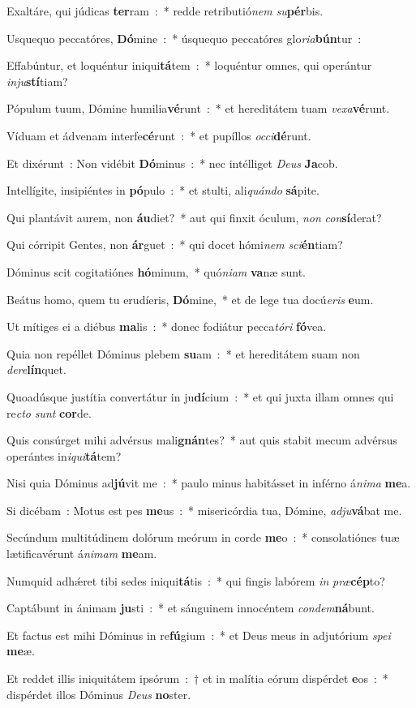 ﻿\item Exaltáre, qui júdicas \textbf{ter}ram~:~* redde retributió\emph{nem} \emph{su}\textbf{pér}bis.
\item Usquequo peccatóres, \textbf{Dó}mine~:~* úsquequo peccatóres glo\emph{ri}\emph{a}\textbf{bún}tur~:
\item Effabúntur, et loquéntur iniqui\textbf{tá}tem~:~* loquéntur omnes, qui operántur \emph{in}\emph{ju}\textbf{stí}tiam?
\item Pópulum tuum, Dómine humilia\textbf{vé}runt~:~* et hereditátem tuam \emph{ve}\emph{xa}\textbf{vé}runt.
\item Víduam et ádvenam interfe\textbf{cé}runt~:~* et pupíllos \emph{oc}\emph{ci}\textbf{dé}runt.
\item Et dixérunt~: Non vidébit \textbf{Dó}minus~:~* nec intélliget \emph{De}\emph{us} \textbf{Ja}cob.
\item Intellígite, insipiéntes in \textbf{pó}pulo~:~* et stulti, ali\emph{quán}\emph{do} \textbf{sá}pite.
\item Qui plantávit aurem, non \textbf{áu}diet?~* aut qui finxit óculum, \emph{non} \emph{con}\textbf{sí}derat?
\item Qui córripit Gentes, non \textbf{ár}guet~:~* qui docet hómi\emph{nem} \emph{sci}\textbf{én}tiam?
\item Dóminus scit cogitatiónes \textbf{hó}minum,~* quó\emph{ni}\emph{am} \textbf{va}næ sunt.
\item Beátus homo, quem tu erudíeris, \textbf{Dó}mine,~* et de lege tua docú\emph{e}\emph{ris} \textbf{e}um.
\item Ut mítiges ei a diébus \textbf{ma}lis~:~* donec fodiátur pecca\emph{tó}\emph{ri} \textbf{fó}vea.
\item Quia non repéllet Dóminus plebem \textbf{su}am~:~* et hereditátem suam non \emph{de}\emph{re}\textbf{lín}quet.
\item Quoadúsque justítia convertátur in ju\textbf{dí}cium~:~* et qui juxta illam omnes qui re\emph{cto} \emph{sunt} \textbf{cor}de.
\item Quis consúrget mihi advérsus mali\textbf{gnán}tes?~* aut quis stabit mecum advérsus operántes in\emph{i}\emph{qui}\textbf{tá}tem?
\item Nisi quia Dóminus ad\textbf{jú}vit me~:~* paulo minus habitásset in inférno á\emph{ni}\emph{ma} \textbf{me}a.
\item Si dicébam~: Motus est pes \textbf{me}us~:~* misericórdia tua, Dómine, \emph{ad}\emph{ju}\textbf{vá}bat me.
\item Secúndum multitúdinem dolórum meórum in corde \textbf{me}o~:~* consolatiónes tuæ lætificavérunt á\emph{ni}\emph{mam} \textbf{me}am.
\item Numquid adhǽret tibi sedes iniqui\textbf{tá}tis~:~* qui fingis labórem \emph{in} \emph{præ}\textbf{cép}to?
\item Captábunt in ánimam \textbf{ju}sti~:~* et sánguinem innocéntem \emph{con}\emph{dem}\textbf{ná}bunt.
\item Et factus est mihi Dóminus in re\textbf{fú}gium~:~* et Deus meus in adjutórium \emph{spe}\emph{i} \textbf{me}æ.
\item Et reddet illis iniquitátem ipsórum~:~† et in malítia eórum dispérdet \textbf{e}os~:~* dispérdet illos Dóminus \emph{De}\emph{us} \textbf{no}\-ster.